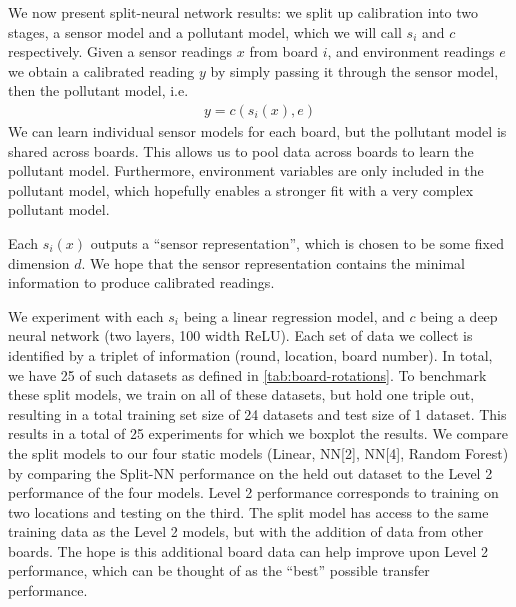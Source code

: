 \documentclass[journal abbreviation, manuscript]{copernicus}
\begin{document}
We now present split-neural network results: we split
up calibration into two stages, a sensor model
and a pollutant model, which we will call $s_i$ and $c$
respectively.
Given a sensor readings $x$ from board $i$,
and environment readings $e$
we obtain a calibrated reading $y$ by simply passing it through
the sensor model, then the pollutant model, i.e.
\begin{align*}
    y = c(s_i(x), e)
\end{align*}
We can learn individual sensor models for each board,
but the pollutant model is shared across boards. This allows
us to pool data across boards to learn the pollutant model.
Furthermore, environment variables are only 
included in the pollutant model, which hopefully enables
a stronger fit with a very complex pollutant model.

Each $s_i(x)$ outputs a ``sensor representation'', which is chosen
to be some fixed dimension $d$. We hope that the sensor representation
contains the minimal information to produce calibrated readings.

We experiment with each $s_i$ being a linear regression model,
and $c$ being a deep neural network (two layers, 100 width ReLU). 
Each set of data we collect
is identified by a triplet of information (round, location, board number). In total, we have 25 of such datasets as defined in \autoref{tab:board-rotations}. To benchmark these split models, we train on all of these datasets, but
hold one triple out, resulting in a
total training set size of 24 datasets and test size of 1 dataset. This results in a total of 25 experiments
for which we boxplot the results.
We compare the split models to our four static models (Linear, NN[2], NN[4], Random Forest) by comparing the Split-NN performance on the held out dataset to the Level 2 performance of the four models.
Level 2 performance corresponds to training on two locations
and testing on the third. The split model has access to the same training data as the Level 2 models, but with the addition of data from other boards. The hope is this additional board data can help improve upon Level 2 performance, which can be thought of as the ``best'' possible transfer performance.
\end{document}
